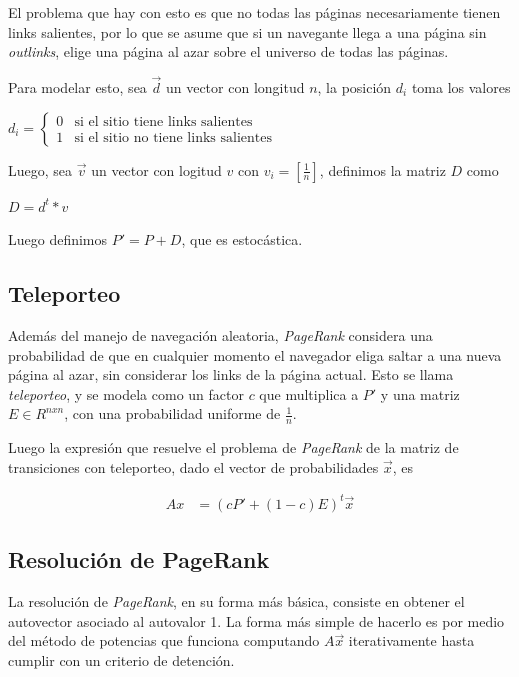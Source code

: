 El problema que hay con esto es que no todas las páginas necesariamente tienen links
salientes, por lo que se asume que si un navegante llega a una página sin \textit{outlinks},
elige una página al azar sobre el universo de todas las páginas.

Para modelar esto, sea $\vec{d}$ un vector con longitud $n$, la posición $d_i$ toma los valores

\begin{math}
d_i =
\left\{
\begin{array}{ll}
0   & \mbox{si el sitio tiene links salientes} \\
1   & \mbox{si el sitio no tiene links salientes}
\end{array}
\right.
\end{math}

Luego, sea $\vec{v}$ un vector con logitud $v$ con $v_i = [\frac{1}{n}]$, definimos
la matriz $D$ como

\begin{math}
D = d^t * v
\end{math}

Luego definimos $P' = P + D$, que es estocástica.

\subsection{Teleporteo}

Además del manejo de navegación aleatoria, \textit{PageRank} considera una probabilidad de que
en cualquier momento el navegador eliga saltar a una nueva página al azar, sin considerar
los links de la página actual. Esto se llama \textit{teleporteo}, y se modela como un factor
$c$ que multiplica a $P'$  y una matriz $E \in R^{nxn}$, con una probabilidad uniforme de $\frac{1}{n}$.

Luego la expresión que resuelve el problema de \textit{PageRank} de la matriz de transiciones
con teleporteo, dado el vector de probabilidades $\vec{x}$, es

\begin{align*}
Ax & =(cP' + (1-c)E)^{t} \vec{x}
\end{align*}

\subsection{Resolución de PageRank}

La resolución de \textit{PageRank}, en su forma más básica, consiste en obtener el autovector
asociado al autovalor 1. La forma más simple de hacerlo es por medio del método de potencias
que funciona computando $A\vec{x}$ iterativamente hasta cumplir con un criterio de detención.


